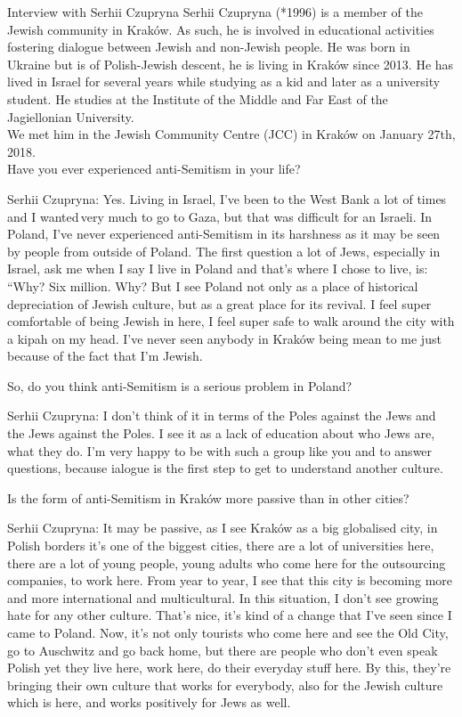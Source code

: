 Interview with Serhii Czupryna  
Serhii Czupryna (*1996) is a member of the Jewish community in Kraków. As such, he is involved in educational activities fostering dialogue between Jewish and non-Jewish people. He was born in Ukraine but is of Polish-Jewish descent, he is living in Kraków since 2013. He has lived in Israel for several years while studying as a kid and later as a university student. He studies at the Institute of the Middle and Far East of the Jagiellonian University. \\

We met him in the Jewish Community Centre (JCC) in Kraków on January 27th, 2018. \\


 

Have you ever experienced anti-Semitism in your life? 

Serhii Czupryna: Yes. Living in Israel, I’ve been to the West Bank a lot of times and I wanted very much to go to Gaza, but that was difficult for an Israeli. In Poland, I’ve never experienced anti-Semitism in its harshness as it may be seen by people from outside of Poland. The first question a lot of Jews, especially in Israel, ask me when I say I live in Poland and that’s where I chose to live, is: “Why? Six million. Why? But I see Poland not only as a place of historical depreciation of Jewish culture, but as a great place for its revival. I feel super comfortable of being Jewish in here, I feel super safe to walk around the city with a kipah on my head. I’ve never seen anybody in Kraków being mean to me just because of the fact that I’m Jewish. 

So, do you think anti-Semitism is a serious problem in Poland? 

Serhii Czupryna: I don’t think of it in terms of the Poles against the Jews and the Jews against the Poles. I see it as a lack of education about who Jews are, what they do. I’m very happy to be with such a group like you and to answer questions, because ialogue is the first step to get to understand another culture.  

 Is the form of anti-Semitism in Kraków more passive than in other cities? 

Serhii Czupryna: It may be passive, as I see Kraków as a big globalised city, in Polish borders it’s one of the biggest cities, there are a lot of universities here, there are a lot of young people, young adults who come here for the outsourcing companies, to work here. From year to year, I see that this city is becoming more and more international and multicultural. In this situation, I don’t see growing hate for any other culture. That’s nice, it's kind of a change that I’ve seen since I came to Poland. Now, it’s not only tourists who come here and see the Old City, go to Auschwitz and go back home, but there are people who don’t even speak Polish yet they live here, work here, do their everyday stuff here. By this, they’re bringing their own culture that works for everybody, also for the Jewish culture which is here, and works positively for Jews as well.  

